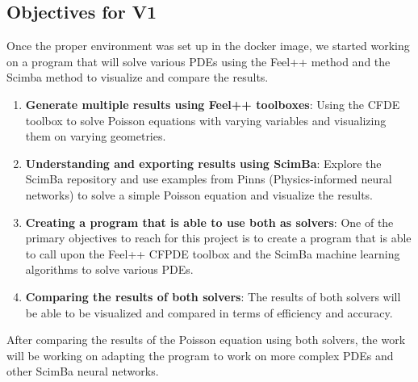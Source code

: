 \documentclass[12pt]{article}
\begin{document}
\newpage

\subsection{Objectives for V1}

Once the proper environment was set up in the docker image, we started working on a
program that will solve various PDEs using the Feel++ method and the Scimba method to
visualize and compare the results.


\begin{enumerate}
    \item \textbf{Generate multiple results using Feel++ toolboxes}: Using the CFDE toolbox to solve Poisson equations with varying variables and visualizing them on varying geometries.
    
    \item \textbf{Understanding and exporting results using ScimBa}: Explore the ScimBa repository and use examples from Pinns (Physics-informed neural networks) to solve a simple Poisson equation and visualize the results.
    
    \item \textbf{Creating a program that is able to use both as solvers}: One of the primary objectives to reach for this project is to create a program that is able to call upon the Feel++ CFPDE toolbox and the ScimBa machine learning algorithms to solve various PDEs.
    
    \item \textbf{Comparing the results of both solvers}: The results of both solvers will be able to be visualized and compared in terms of efficiency and accuracy.
\end{enumerate}

After comparing the results of the Poisson equation using both solvers, the work will be working on adapting the program to work on more complex PDEs and other ScimBa neural networks.
\end{document}
